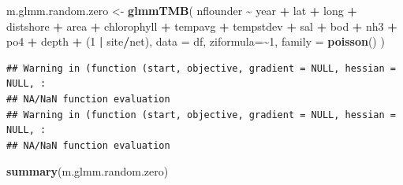 \documentclass[
]{article}
\newenvironment{Shaded}{\begin{snugshade}}{\end{snugshade}}
\newcommand{\AttributeTok}[1]{\textcolor[rgb]{0.13,0.29,0.53}{#1}}
\newcommand{\DecValTok}[1]{\textcolor[rgb]{0.00,0.00,0.81}{#1}}
\newcommand{\FunctionTok}[1]{\textcolor[rgb]{0.13,0.29,0.53}{\textbf{#1}}}
\newcommand{\NormalTok}[1]{#1}
\newcommand{\OtherTok}[1]{\textcolor[rgb]{0.56,0.35,0.01}{#1}}
\newcommand{\SpecialCharTok}[1]{\textcolor[rgb]{0.81,0.36,0.00}{\textbf{#1}}}
\begin{document}
\begin{Shaded}
\begin{Highlighting}[]
\NormalTok{m.glmm.random.zero }\OtherTok{\textless{}{-}} \FunctionTok{glmmTMB}\NormalTok{(}
\NormalTok{    nflounder }\SpecialCharTok{\textasciitilde{}}\NormalTok{ year }\SpecialCharTok{+}\NormalTok{ lat }\SpecialCharTok{+}\NormalTok{ long }\SpecialCharTok{+}\NormalTok{ distshore }\SpecialCharTok{+}\NormalTok{ area }\SpecialCharTok{+}\NormalTok{ chlorophyll }\SpecialCharTok{+}\NormalTok{ tempavg }\SpecialCharTok{+}\NormalTok{ tempstdev }\SpecialCharTok{+}\NormalTok{ sal }\SpecialCharTok{+}\NormalTok{ bod }\SpecialCharTok{+}\NormalTok{ nh3 }\SpecialCharTok{+}\NormalTok{ po4 }\SpecialCharTok{+}\NormalTok{ depth }\SpecialCharTok{+}\NormalTok{ (}\DecValTok{1} \SpecialCharTok{|}\NormalTok{ site}\SpecialCharTok{/}\NormalTok{net), }
    \AttributeTok{data =}\NormalTok{ df, }
    \AttributeTok{ziformula=}\SpecialCharTok{\textasciitilde{}}\DecValTok{1}\NormalTok{,}
    \AttributeTok{family =} \FunctionTok{poisson}\NormalTok{()}
\NormalTok{)}
\end{Highlighting}
\end{Shaded}

\begin{verbatim}
## Warning in (function (start, objective, gradient = NULL, hessian = NULL, :
## NA/NaN function evaluation
## Warning in (function (start, objective, gradient = NULL, hessian = NULL, :
## NA/NaN function evaluation
\end{verbatim}

\begin{Shaded}
\begin{Highlighting}[]
\FunctionTok{summary}\NormalTok{(m.glmm.random.zero)}
\end{Highlighting}
\end{Shaded}
\end{document}

